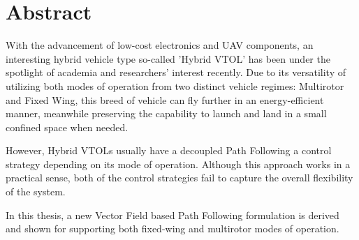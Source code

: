 \chapter*{Abstract}

With the advancement of low-cost electronics and UAV components, an interesting hybrid vehicle type so-called 'Hybrid VTOL' has been under the spotlight of academia and researchers' interest recently. Due to its versatility of utilizing both modes of operation from two distinct vehicle regimes: Multirotor and Fixed Wing, this breed of vehicle can fly further in an energy-efficient manner, meanwhile preserving the capability to launch and land in a small confined space when needed.

However, Hybrid VTOLs usually have a decoupled Path Following a control strategy depending on its mode of operation. Although this approach works in a practical sense, both of the control strategies fail to capture the overall flexibility of the system.

In this thesis, a new Vector Field based Path Following formulation is derived and shown for supporting both fixed-wing and multirotor modes of operation.